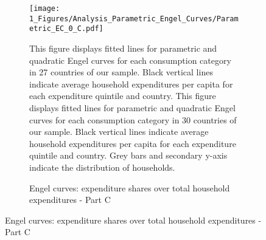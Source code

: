 \begin{figure}[ht!]\ContinuedFloat
   \begin{subfigure}[b]{\textwidth}
  \centering
  \texttt{[image: 1\_Figures/Analysis\_Parametric\_Engel\_Curves/Parametric\_EC\_0\_C.pdf]}
  \caption{Engel curves: expenditure shares over total household expenditures - Part C} \label{fig:Engel_3}
  \begin{subcaption2}
    This figure displays fitted lines for parametric and quadratic Engel curves for each consumption category in 27 countries of our sample. Black vertical lines indicate average household expenditures per capita for each expenditure quintile and country. This figure displays fitted lines for parametric and quadratic Engel curves for each consumption category in 30 countries of our sample. Black vertical lines indicate average household expenditures per capita for each expenditure quintile and country. Grey bars and secondary y-axis indicate the distribution of households.
  \end{subcaption2}
\end{subfigure}
\end{figure}


